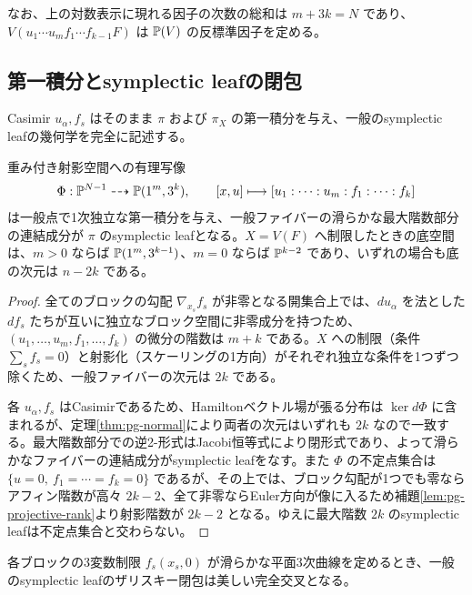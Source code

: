 なお、上の対数表示に現れる因子の次数の総和は $m+3k=N$ であり、$V(u_1\cdots u_m f_1\cdots f_{k-1}F)$ は $\mathbb P(V)$ の反標準因子を定める。

\subsection{第一積分とsymplectic leafの閉包}
Casimir $u_\alpha,f_s$ はそのまま $\pi$ および $\pi_X$ の第一積分を与え、一般のsymplectic leafの幾何学を完全に記述する。

\begin{proposition}\label{prop:pg-first-integrals}
重み付き射影空間への有理写像
\begin{equation}
\Phi:\mathbb P^{N-1}\dashrightarrow\mathbb P(1^m,3^k),\qquad
[x,u]\longmapsto[u_1:\cdots:u_m:f_1:\cdots:f_k]
\end{equation}
は一般点で1次独立な第一積分を与え、一般ファイバーの滑らかな最大階数部分の連結成分が $\pi$ のsymplectic leafとなる。$X=V(F)$ へ制限したときの底空間は、$m>0$ ならば $\mathbb P(1^m,3^{k-1})$、$m=0$ ならば $\mathbb P^{k-2}$ であり、いずれの場合も底の次元は $n-2k$ である。
\end{proposition}
\begin{proof}
全てのブロックの勾配 $\nabla_{x_s}f_s$ が非零となる開集合上では、$du_\alpha$ を法とした $df_s$ たちが互いに独立なブロック空間に非零成分を持つため、$(u_1,\ldots,u_m,f_1,\ldots,f_k)$ の微分の階数は $m+k$ である。$X$ への制限（条件 $\sum_s f_s=0$）と射影化（スケーリングの1方向）がそれぞれ独立な条件を1つずつ除くため、一般ファイバーの次元は $2k$ である。

各 $u_\alpha,f_s$ はCasimirであるため、Hamiltonベクトル場が張る分布は $\ker d\Phi$ に含まれるが、定理\ref{thm:pg-normal}により両者の次元はいずれも $2k$ なので一致する。最大階数部分での逆2-形式はJacobi恒等式により閉形式であり、よって滑らかなファイバーの連結成分がsymplectic leafをなす。また $\Phi$ の不定点集合は $\{u=0,\ f_1=\cdots=f_k=0\}$ であるが、その上では、ブロック勾配が1つでも零ならアフィン階数が高々 $2k-2$、全て非零ならEuler方向が像に入るため補題\ref{lem:pg-projective-rank}より射影階数が $2k-2$ となる。ゆえに最大階数 $2k$ のsymplectic leafは不定点集合と交わらない。
\end{proof}

各ブロックの3変数制限 $f_s(x_s,0)$ が滑らかな平面3次曲線を定めるとき、一般のsymplectic leafのザリスキー閉包は美しい完全交叉となる。

